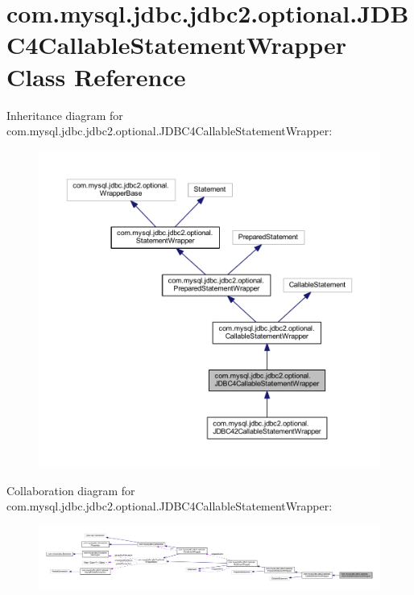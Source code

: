 \hypertarget{classcom_1_1mysql_1_1jdbc_1_1jdbc2_1_1optional_1_1_j_d_b_c4_callable_statement_wrapper}{}\section{com.\+mysql.\+jdbc.\+jdbc2.\+optional.\+J\+D\+B\+C4\+Callable\+Statement\+Wrapper Class Reference}
\label{classcom_1_1mysql_1_1jdbc_1_1jdbc2_1_1optional_1_1_j_d_b_c4_callable_statement_wrapper}


Inheritance diagram for com.\+mysql.\+jdbc.\+jdbc2.\+optional.\+J\+D\+B\+C4\+Callable\+Statement\+Wrapper\+:
\nopagebreak
\begin{figure}[H]
\begin{center}
\leavevmode
\includegraphics[width=350pt]{classcom_1_1mysql_1_1jdbc_1_1jdbc2_1_1optional_1_1_j_d_b_c4_callable_statement_wrapper__inherit__graph}
\end{center}
\end{figure}


Collaboration diagram for com.\+mysql.\+jdbc.\+jdbc2.\+optional.\+J\+D\+B\+C4\+Callable\+Statement\+Wrapper\+:
\nopagebreak
\begin{figure}[H]
\begin{center}
\leavevmode
\includegraphics[width=350pt]{classcom_1_1mysql_1_1jdbc_1_1jdbc2_1_1optional_1_1_j_d_b_c4_callable_statement_wrapper__coll__graph}
\end{center}
\end{figure}
